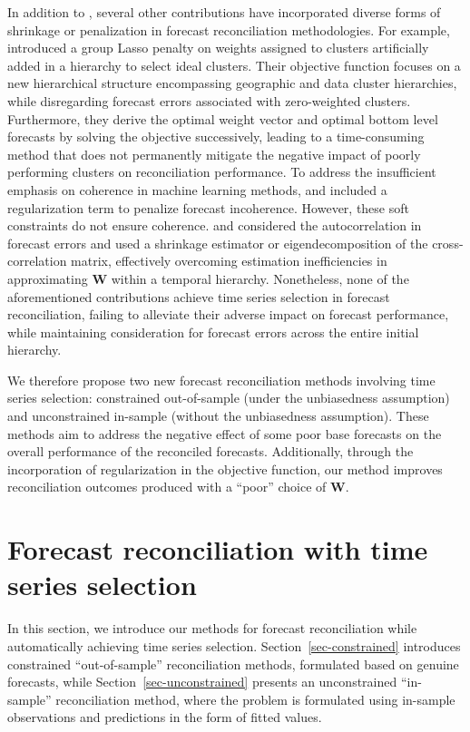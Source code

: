 \documentclass[
  11pt]{article}
\theoremstyle{plain}
\theoremstyle{remark}
\begin{document}
In addition to \citet{Ben_Taieb2019-be}, several other contributions
have incorporated diverse forms of shrinkage or penalization in forecast
reconciliation methodologies. For example, \citet{Pang2022-hi}
introduced a group Lasso penalty on weights assigned to clusters
artificially added in a hierarchy to select ideal clusters. Their
objective function focuses on a new hierarchical structure encompassing
geographic and data cluster hierarchies, while disregarding forecast
errors associated with zero-weighted clusters. Furthermore, they derive
the optimal weight vector and optimal bottom level forecasts by solving
the objective successively, leading to a time-consuming method that does
not permanently mitigate the negative impact of poorly performing
clusters on reconciliation performance. To address the insufficient
emphasis on coherence in machine learning methods,
\citet{Mishchenko2019-as} and \citet{Gleason2020-fo} included a
regularization term to penalize forecast incoherence. However, these
soft constraints do not ensure coherence. \citet{Nystrup2020-te} and
\citet{Nystrup2021-di} considered the autocorrelation in forecast errors
and used a shrinkage estimator or eigendecomposition of the
cross-correlation matrix, effectively overcoming estimation
inefficiencies in approximating \(\bm{W}\) within a temporal hierarchy.
Nonetheless, none of the aforementioned contributions achieve time
series selection in forecast reconciliation, failing to alleviate their
adverse impact on forecast performance, while maintaining consideration
for forecast errors across the entire initial hierarchy.

We therefore propose two new forecast reconciliation methods involving
time series selection: constrained out-of-sample (under the unbiasedness
assumption) and unconstrained in-sample (without the unbiasedness
assumption). These methods aim to address the negative effect of some
poor base forecasts on the overall performance of the reconciled
forecasts. Additionally, through the incorporation of regularization in
the objective function, our method improves reconciliation outcomes
produced with a ``poor'' choice of \(\bm{W}\).

\section{Forecast reconciliation with time series
selection}\label{sec-methodology}

In this section, we introduce our methods for forecast reconciliation
while automatically achieving time series selection.
Section~\ref{sec-constrained} introduces constrained ``out-of-sample''
reconciliation methods, formulated based on genuine forecasts, while
Section~\ref{sec-unconstrained} presents an unconstrained ``in-sample''
reconciliation method, where the problem is formulated using in-sample
observations and predictions in the form of fitted values.
\end{document}
